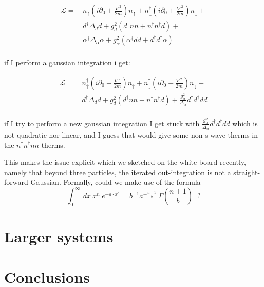 \documentclass{article}
\begin{document}
\begin{align*}
    \mathcal{L}= & \, n^{\dag}_\uparrow\left(i\partial_0+\frac{\nabla^2}{2m}\right)n_\uparrow+n^{\dag}_\downarrow\left(i\partial_0+\frac{\nabla^2}{2m}\right)n_\downarrow+\\
    &\, d^{\dag}\Delta_dd+g^2_d\left( d^{\dag}nn+n^\dag n^\dag d \right)+\\
    &\, \alpha^\dag\Delta_\alpha\alpha+g^2_\alpha\left(\alpha^\dag dd+d^\dag d^\dag \alpha\right)\\
\end{align*}

if I perform a gaussian integration i get:

\begin{align*}
    \mathcal{L}= & \, n^{\dag}_\uparrow\left(i\partial_0+\frac{\nabla^2}{2m}\right)n_\uparrow+n^{\dag}_\downarrow\left(i\partial_0+\frac{\nabla^2}{2m}\right)n_\downarrow+\\
    &\, d^{\dag}\Delta_dd+g^2_d\left( d^{\dag}nn+n^\dag n^\dag d \right)+\frac{g^2_\alpha}{\Delta_\alpha} d^{\dag} d^{\dag}dd\\
\end{align*}

if I try to perform a new gaussian integration I get stuck with $\frac{g^2_\alpha}{\Delta_\alpha} d^{\dag} d^{\dag}dd$ which is not quadratic nor linear, and I guess that would give some non s-wave therms in the $n^\dag n^\dag n n$ therms.

This makes the issue explicit which we sketched on the white board recently, namely that beyond
three particles, the iterated out-integration is not a straight-forward Gaussian. Formally, could we
make use of the formula
$$\int_0^\infty~dx~x^n~e^{-a\cdot x^b}=b^{-1}a^{-\frac{n+1}{b}}~\Gamma\left(\frac{n+1}{b}\right)\;\;?$$



\section{Larger systems}


\section{Conclusions}

\newpage


\end{document}
